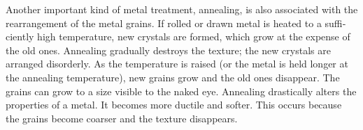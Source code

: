 Another important kind of metal treatment, anneal­ing, is also associated with the rearrangement of the metal grains. If rolled or drawn metal is heated to a suffi­ciently high temperature, new crystals are formed, which grow at the expense of the old ones. Annealing gradually destroys the texture; the new crystals are arranged dis­orderly. As the temperature is raised (or the metal is held longer at the annealing temperature), new grains grow and the old ones disappear. The grains can grow to a size visible to the naked eye. Annealing drastically alters the properties of a metal. It becomes more ductile and softer. This occurs because the grains become coarser and the texture disappears.


%
%





